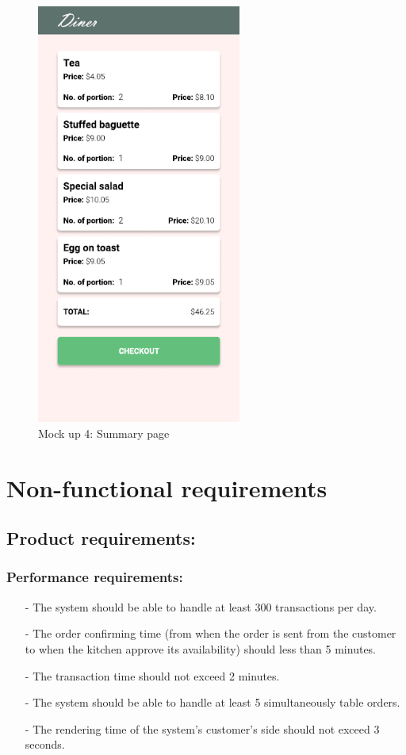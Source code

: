 \documentclass[a4paper,11pt]{extarticle}
\begin{document}
\begin{enumerate}[wide=0pt]
\begin{figure}[htbp]
            \includegraphics[width=0.6\textwidth]{summary_page.png}
            \caption{Mock up 4: Summary page}
            \label{fig:summary}
        \end{figure}        
\end{enumerate}
\newpage

\section{Non-functional requirements}

\subsection{Product requirements:}
\subsubsection{Performance requirements:}
\begin{itemize}[wide=0pt]
    \item[-] The system should be able to handle at least 300 transactions per day.
    \item[-] The order confirming time (from when the order is sent from the customer to when the kitchen approve its availability) should less than 5 minutes.
    \item[-] The transaction time should not exceed 2 minutes.
    \item[-] The system should be able to handle at least 5 simultaneously table orders.
    \item[-] The rendering time of the system's customer's side should not exceed 3 seconds.
\end{itemize}
\end{document}
